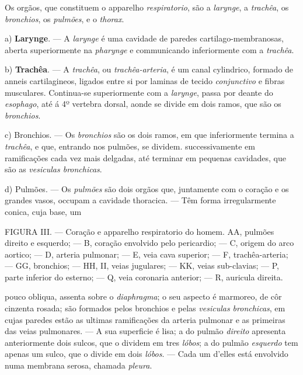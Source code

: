 
  
Os orgãos, que constituem o apparelho \emph{respiratorio}, são a \emph{larynge}, a \emph{trachêa}, os \emph{bronchios}, os \emph{pulmões}, e o \emph{thorax}.

a) \textbf{Larynge}. --- A \emph{larynge} é uma cavidade de paredes cartilago-membranosas, aberta superiormente na \emph{pharynge} e communicando inferiormente com a \emph{trachêa}.

b) \textbf{Trachêa}. --- A \emph{trachêa}, ou \emph{trachêa-arteria}, é um canal cylindrico, formado de anneis cartilagineos, ligados entre si por laminas de tecido \emph{conjunctivo} e fibras musculares. Continua-se superiormente com a \emph{larynge}, passa por deante do   \emph{esophago}, até á 4º vertebra dorsal, aonde se divide em dois ramos, que são os \emph{bronchios}.

c) Bronchios. --- Os \emph{bronchios} são os dois ramos, em que inferiormente termina a \emph{trachêa}, e que, entrando nos pulmões, se dividem. successivamente em ramificações cada vez mais delgadas, até terminar em pequenas cavidades, que são as \emph{vesiculas bronchicas}.

d) Pulmões. --- Os \emph{pulmões} são dois orgãos que, juntamente com o coração e os grandes vasos, occupam a cavidade thoracica. --- Têm forma irregularmente conica, cuja base, um

FIGURA III. --- Coração e apparelho respiratorio do homem. AA, pulmões direito e esquerdo; --- B, coração envolvido pelo pericardio; --- C, origem do arco aortico; --- D, arteria pulmonar; --- E, veia cava superior; --- F, trachêa-arteria; --- GG, bronchios; --- HH, II, veias jugulares; --- KK, veias sub-clavias; --- P, parte inferior do esterno; --- Q, veia coronaria anterior; --- R, auricula direita.

pouco obliqua, assenta sobre o \emph{diaphragma}; o seu aspecto é marmoreo, de côr cinzenta rosada; são formados pelos bronchios e pelas \emph{vesiculas bronchicas}, em cujas paredes estão as ultimas ramificações da arteria pulmonar e as primeiras das veias pulmonares. --- A sua superficie é lisa; a do pulmão \emph{direito} apresenta anteriormente dois sulcos, que o dividem   em tres \emph{lóbos}; a do pulmão \emph{esquerdo} tem apenas um sulco, que o divide em dois \emph{lóbos}. --- Cada um d'elles está envolvido numa membrana serosa, chamada \emph{pleura}.

